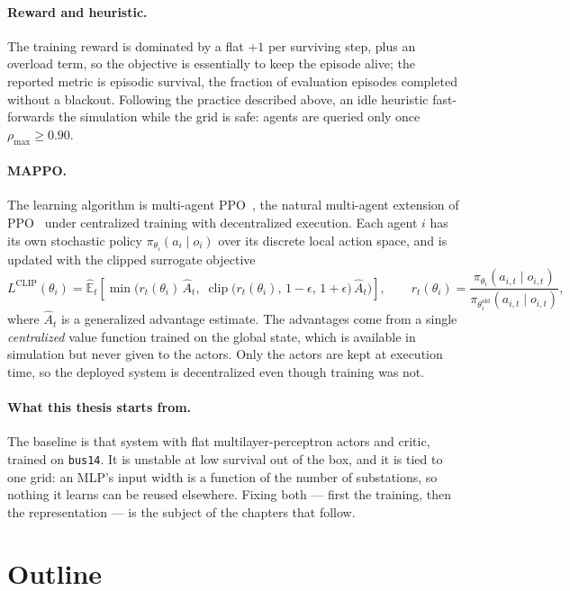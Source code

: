 \paragraph{Reward and heuristic.}
The training reward is dominated by a flat $+1$ per surviving step, plus an
overload term, so the objective is essentially to keep the episode alive; the
reported metric is episodic survival, the fraction of evaluation episodes
completed without a blackout. Following the practice described above, an idle
heuristic fast-forwards the simulation while the grid is safe: agents are
queried only once $\rho_{\max} \geq 0.90$.

\paragraph{MAPPO.}
The learning algorithm is multi-agent PPO~\cite{yu2022mappo}, the natural
multi-agent extension of PPO~\cite{schulman2017ppo} under centralized training
with decentralized execution. Each agent $i$ has its own stochastic policy
$\pi_{\theta_i}(a_i \mid o_i)$ over its discrete local action space, and is
updated with the clipped surrogate objective
\[
  L^{\text{CLIP}}(\theta_i)
  = \hat{\mathbb{E}}_t\!\left[
      \min\!\Big(
        r_t(\theta_i)\,\hat{A}_t,\;
        \operatorname{clip}\big(r_t(\theta_i),\,1-\epsilon,\,1+\epsilon\big)\,
        \hat{A}_t
      \Big)
    \right],
  \qquad
  r_t(\theta_i)
  = \frac{\pi_{\theta_i}(a_{i,t} \mid o_{i,t})}
         {\pi_{\theta_i^{\text{old}}}(a_{i,t} \mid o_{i,t})},
\]
where $\hat{A}_t$ is a generalized advantage estimate. The advantages come from
a single \emph{centralized} value function trained on the global state, which is
available in simulation but never given to the actors. Only the actors are kept
at execution time, so the deployed system is decentralized even though training
was not.

\paragraph{What this thesis starts from.}
The baseline is that system with flat multilayer-perceptron actors and critic,
trained on \texttt{bus14}. It is unstable at low survival out of the box, and it
is tied to one grid: an MLP's input width is a function of the number of
substations, so nothing it learns can be reused elsewhere. Fixing both --- first
the training, then the representation --- is the subject of the chapters that
follow.

\section{Outline}
\label{sec:intro-outline}

